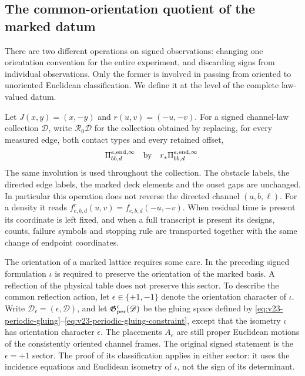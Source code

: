 \subsection{The common-orientation quotient of the marked datum}
\label{subsec:v28-common-orientation}

There are two different operations on signed observations: changing one
orientation convention for the entire experiment, and discarding signs from
individual observations.  Only the former is involved in passing from
oriented to unoriented Euclidean classification.  We define it at the level
of the complete law-valued datum.

Let \(J(x,y)=(x,-y)\) and \(r(u,v)=(-u,-v)\).  For a signed channel-law
collection \(\mathscr D\), write \(\mathscr R_0\mathscr D\) for the collection
obtained by replacing, for every measured edge, both contact types and every
retained offset,
\begin{equation}\label{eq:v28-law-reflection}
 \Pi^{e,\mathrm{end},\infty}_{bb,d}
 \quad\hbox{by}\quad r_*\Pi^{e,\mathrm{end},\infty}_{bb,d}.
\end{equation}
The same involution is used throughout the collection.  The obstacle labels,
the directed edge labels, the marked deck elements and the onset gaps are
unchanged.  In particular this operation does not reverse the directed
channel \((a,b,\ell)\).  For a density it reads
\(f^r_{e,b,d}(u,v)=f_{e,b,d}(-u,-v)\).  When residual time is present its
coordinate is left fixed, and when a full transcript is present its designs,
counts, failure symbols and stopping rule are transported together with the
same change of endpoint coordinates.

The orientation of a marked lattice requires some care.  In the preceding
signed formulation \(\iota\) is required to preserve the orientation of the
marked basis.  A reflection of the physical table does not preserve this
sector.  To describe the common reflection action, let
\(\epsilon\in\{+1,-1\}\) denote the orientation character of \(\iota\).
Write \(\mathscr D_\epsilon=(\epsilon,\mathscr D)\), and let
\(\mathfrak G^\epsilon_{\rm per}(\mathscr D)\) be the gluing space defined by
\eqref{eq:v23-periodic-gluing}--\eqref{eq:v23-periodic-gluing-constraint},
except that the isometry \(\iota\) has orientation character \(\epsilon\).
The placements \(A_e\) are still proper Euclidean motions of the consistently
oriented channel frames.  The original signed statement is the
\(\epsilon=+1\) sector.  The proof of its classification applies in either
sector: it uses the incidence equations and Euclidean isometry of \(\iota\),
not the sign of its determinant.

